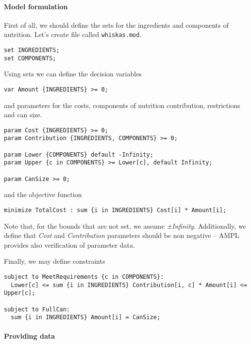 \paragraph{Model formulation}

First of all, we should define the sets for the ingredients and components of nutrition. Let's  create file called \texttt{whiskas.mod}.

\begin{lstlisting}
set INGREDIENTS;
set COMPONENTS;
\end{lstlisting}

Using sets we can define the decision variables
\begin{lstlisting}
var Amount {INGREDIENTS} >= 0;
\end{lstlisting}

and parameters for the costs, components of nutrition contribution, restrictions and can size.

\begin{lstlisting}
param Cost {INGREDIENTS} >= 0;
param Contribution {INGREDIENTS, COMPONENTS} >= 0;

param Lower {COMPONENTS} default -Infinity;
param Upper {c in COMPONENTS} >= Lower[c], default Infinity;

param CanSize >= 0;

\end{lstlisting}

and the objective function

\begin{lstlisting}
minimize TotalCost : sum {i in INGREDIENTS} Cost[i] * Amount[i];
\end{lstlisting}

Note that, for the bounds that are not set, we assume \emph{±Infinity}. Additionally, we define that \emph{Cost} and \emph{Contribution} parameters should be non negative -- AMPL provides also verification of parameter data.


Finally, we may define constraints

\begin{lstlisting}
subject to MeetRequirements {c in COMPONENTS}:
  Lower[c] <= sum {i in INGREDIENTS} Contribution[i, c] * Amount[i] <= Upper[c];
  
subject to FullCan: 
  sum {i in INGREDIENTS} Amount[i] = CanSize;
\end{lstlisting}

\paragraph{Providing data}

